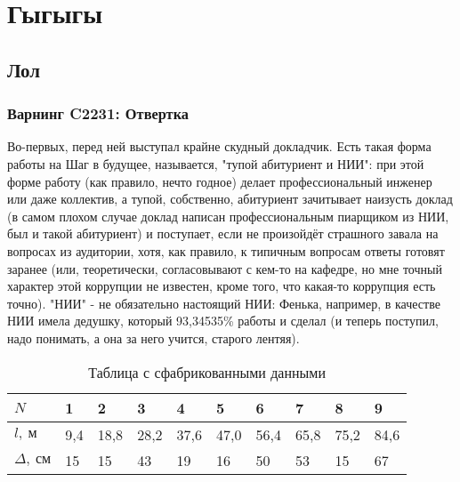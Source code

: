 \documentclass[russian, 12pt]{article}
\begin{document}
\MTDTitlePage
\MTDInfoPage

\section{Гыгыгы}
\subsection{Лол}
\subsubsection{Варнинг C2231: Отвертка}

Во-первых, перед ней выступал крайне скудный докладчик. Есть такая форма работы на Шаг в будущее, называется, "тупой абитуриент и НИИ": при этой форме работу (как правило, нечто годное) делает профессиональный инженер или даже коллектив, а тупой, собственно, абитуриент зачитывает наизусть доклад (в самом плохом случае доклад написан профессиональным пиарщиком из НИИ, был и такой абитуриент) и поступает, если не произойдёт страшного завала на вопросах из аудитории, хотя, как правило, к типичным вопросам ответы готовят заранее (или, теоретически, согласовывают с кем-то на кафедре, но мне точный характер этой коррупции не известен, кроме того, что какая-то коррупция есть точно). "НИИ" - не обязательно настоящий НИИ: Фенька, например, в качестве НИИ имела дедушку, который 93,34535\% работы и сделал (и теперь поступил, надо понимать, а она за него учится, старого лентяя).

\begin{table}[h!]
\caption{\indent Таблица с сфабрикованными данными}
\vspace{-0.25cm}
\begin{center}
\begin{tabular}{|p{1cm}|p{1cm}|p{1cm}|p{1cm}|p{1cm}|p{1cm}|p{1cm}|p{1cm}|p{1cm}|p{1cm}|}
\hline
$N$ & 1 & 2 & 3 & 4  & 5 & 6 & 7 & 8 & 9    \\
\hline
$l,\ \text{м}$ & 9,4 & 18,8 & 28,2 & 37,6 & 47,0 & 56,4 & 65,8 & 75,2 & 84,6   \\
\hline
$\Delta,\ \text{см}$ & 15 & 15 & 43 & 19 & 16 & 50 & 53 & 15 & 67   \\
\hline
\end{tabular}
\end{center}
\end{table}
\end{document}

